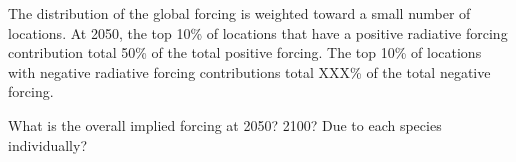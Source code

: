 The distribution of the global forcing is weighted toward a small number of locations. At 2050, the top 10\% of locations that have a positive radiative forcing contribution total 50\% of the total positive forcing. The top 10\% of locations with negative radiative forcing contributions total XXX\% of the total negative forcing.

What is the overall implied forcing at 2050? 2100? Due to each species individually?
